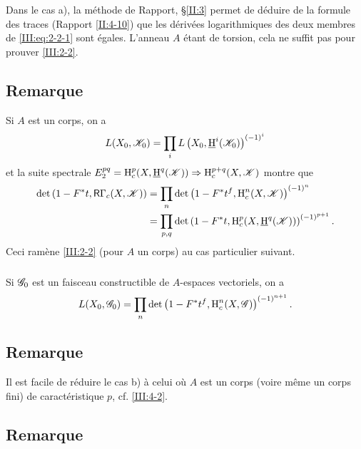 Dans le cas a), la m\'ethode de Rapport, \S\ref{II:3} permet de d\'eduire de 
la formule des traces (Rapport \ref{II:4-10}) que les d\'eriv\'ees logarithmiques 
des deux membres de \eqref{III:eq:2-2-1} sont \'egales. L'anneau $A$ \'etant de 
torsion, cela ne suffit pas pour prouver \ref{III:2-2}. 





\subsection{Remarque}\label{III:2-4}

Si $A$ est un corps, on a 
\[
  L(X_0,\mathscr{K}_0) = \prod_i L\left(X_0,\underline{\operatorname{H}}^i(\mathscr{K}_0)\right)^{(-1)^i}
\]
et la suite spectrale 
$E_2^{p q} = \operatorname{H}_c^p(X,\underline{\operatorname{H}}^q(\mathscr{K}))\Rightarrow \operatorname{H}_c^{p+q}(X,\mathscr{K})$ montre 
que 
\begin{align*}
  \det\left(1-F^* t, \mathsf{R}\Gamma_c(X,\mathscr{K})\right) 
    &= \prod_n \det\left(1-F^* t^f,\operatorname{H}_c^n(X,\mathscr{K})\right)^{(-1)^n} \\
    &= \prod_{p,q} \det\left(1-F^* t,\operatorname{H}_c^p(X,\underline{\operatorname{H}}^q(\mathscr{K}))\right)^{(-1)^{p+1}} \text{.}
\end{align*}
Ceci ram\`ene \ref{III:2-2} (pour $A$ un corps) au cas particulier suivant. 


\subsubsection{}\label{III:2-4-1}

Si $\mathscr{G}_0$ est un faisceau constructible de $A$-espaces vectoriels, on a 
\[
  L(X_0,\mathscr{G}_0) = \prod_n \det\left(1-F^* t^f,\operatorname{H}_c^n(X,\mathscr{G})\right)^{(-1)^{n+1}} \text{.}
\]





\subsection{Remarque}\label{III:2-5}

Il est facile de r\'eduire le cas b) \`a celui o\`u $A$ est un corps (voire 
m\^eme un corps fini) de caract\'eristique $p$, cf. \ref{III:4-2}. 





\subsection{Remarque}\label{III:2-6}

